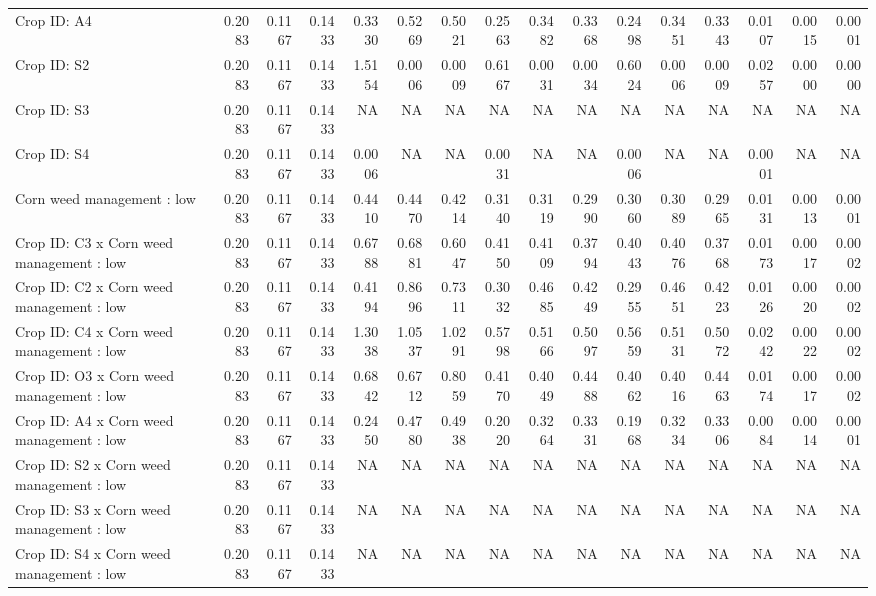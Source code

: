 \documentclass[
]{article}
\begin{document}
\begin{landscape}
\begin{table}
\begin{threeparttable}
{\begin{tabular}[t]{lrr>{}rrr>{}rrr>{}rrr>{}rrr>{}r}
Crop ID: A4 & 0.2083 & 0.1167 & 0.1433 & 0.3330 & 0.5269 & 0.5021 & 0.2563 & 0.3482 & 0.3368 & 0.2498 & 0.3451 & 0.3343 & 0.0107 & 0.0015 & 0.0001\\
Crop ID: S2 & 0.2083 & 0.1167 & 0.1433 & 1.5154 & 0.0006 & 0.0009 & 0.6167 & 0.0031 & 0.0034 & 0.6024 & 0.0006 & 0.0009 & 0.0257 & 0.0000 & 0.0000\\
Crop ID: S3 & 0.2083 & 0.1167 & 0.1433 & NA & NA & NA & NA & NA & NA & NA & NA & NA & NA & NA & NA\\
Crop ID: S4 & 0.2083 & 0.1167 & 0.1433 & 0.0006 & NA & NA & 0.0031 & NA & NA & 0.0006 & NA & NA & 0.0001 & NA & NA\\
Corn weed management : low & 0.2083 & 0.1167 & 0.1433 & 0.4410 & 0.4470 & 0.4214 & 0.3140 & 0.3119 & 0.2990 & 0.3060 & 0.3089 & 0.2965 & 0.0131 & 0.0013 & 0.0001\\
Crop ID: C3 x Corn weed management : low & 0.2083 & 0.1167 & 0.1433 & 0.6788 & 0.6881 & 0.6047 & 0.4150 & 0.4109 & 0.3794 & 0.4043 & 0.4076 & 0.3768 & 0.0173 & 0.0017 & 0.0002\\
Crop ID: C2 x Corn weed management : low & 0.2083 & 0.1167 & 0.1433 & 0.4194 & 0.8696 & 0.7311 & 0.3032 & 0.4685 & 0.4249 & 0.2955 & 0.4651 & 0.4223 & 0.0126 & 0.0020 & 0.0002\\
Crop ID: C4 x Corn weed management : low & 0.2083 & 0.1167 & 0.1433 & 1.3038 & 1.0537 & 1.0291 & 0.5798 & 0.5166 & 0.5097 & 0.5659 & 0.5131 & 0.5072 & 0.0242 & 0.0022 & 0.0002\\
Crop ID: O3 x Corn weed management : low & 0.2083 & 0.1167 & 0.1433 & 0.6842 & 0.6712 & 0.8059 & 0.4170 & 0.4049 & 0.4488 & 0.4062 & 0.4016 & 0.4463 & 0.0174 & 0.0017 & 0.0002\\
Crop ID: A4 x Corn weed management : low & 0.2083 & 0.1167 & 0.1433 & 0.2450 & 0.4780 & 0.4938 & 0.2020 & 0.3264 & 0.3331 & 0.1968 & 0.3234 & 0.3306 & 0.0084 & 0.0014 & 0.0001\\
Crop ID: S2 x Corn weed management : low & 0.2083 & 0.1167 & 0.1433 & NA & NA & NA & NA & NA & NA & NA & NA & NA & NA & NA & NA\\
Crop ID: S3 x Corn weed management : low & 0.2083 & 0.1167 & 0.1433 & NA & NA & NA & NA & NA & NA & NA & NA & NA & NA & NA & NA\\
Crop ID: S4 x Corn weed management : low & 0.2083 & 0.1167 & 0.1433 & NA & NA & NA & NA & NA & NA & NA & NA & NA & NA & NA & NA\\
\bottomrule
\end{tabular}}
\begin{tablenotes}[para]

\end{tablenotes}
\end{threeparttable}
\end{table}
\end{landscape}
\end{document}

